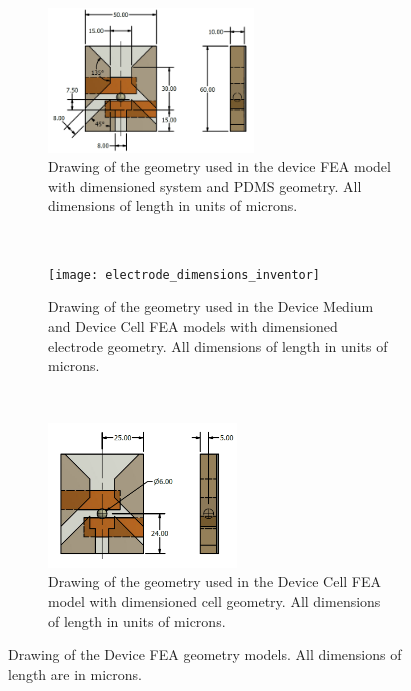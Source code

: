  \begin{figure}[h]
    \centering
    \begin{subfigure}[b]{\textwidth}
      \centering
    \includegraphics[width=0.6\textwidth]{images/channel_dimensions_inventor.png}
    \caption[]{Drawing of the geometry used in the device FEA model with dimensioned system and PDMS geometry. All dimensions of length in units of microns.}
    \label{fig:device_channel_dimensions_FEA}
    \end{subfigure}
    \\
    \vspace{0.2 in}
    \begin{subfigure}[b]{\textwidth}
        \centering
        \texttt{[image: electrode\_dimensions\_inventor]}
       \caption{Drawing of the geometry used in the Device Medium and Device Cell FEA models with dimensioned electrode geometry. All dimensions of length in units of microns.}
        \label{fig:device_electrode_dimensions_FEA}
    \end{subfigure} 
    \\
    \vspace{0.2 in}
    \begin{subfigure}[b]{\textwidth}
        \centering
        \includegraphics[width=0.55\textwidth]{images/particle_dimension_inventor.png}
        \caption{Drawing of the geometry used in the Device Cell FEA model with dimensioned cell geometry. All dimensions of length in units of microns.}
        \label{fig:device_cell_dimensions_FEA}
    \end{subfigure} 
    \caption[Device FEA model geometry.]{Drawing of the Device FEA geometry models. All dimensions of length are in microns.}
    \label{fig: FEA_device_geometry}
 \end{figure}



